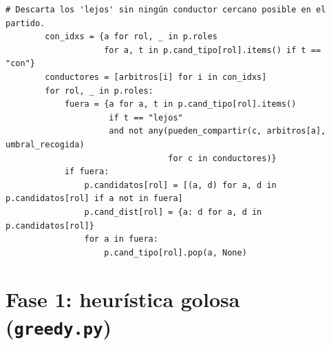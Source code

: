 \documentclass[11pt,a4paper,spanish]{book}
\numberwithin{equation}{chapter}
\numberwithin{figure}{chapter}
\numberwithin{table}{chapter}
\begin{document}
\begin{lstlisting}[caption={\texttt{datos.py} --- solape horario, coche compartido y cálculo de candidatos.}]
        # Descarta los 'lejos' sin ningún conductor cercano posible en el partido.
        con_idxs = {a for rol, _ in p.roles
                    for a, t in p.cand_tipo[rol].items() if t == "con"}
        conductores = [arbitros[i] for i in con_idxs]
        for rol, _ in p.roles:
            fuera = {a for a, t in p.cand_tipo[rol].items()
                     if t == "lejos"
                     and not any(pueden_compartir(c, arbitros[a], umbral_recogida)
                                 for c in conductores)}
            if fuera:
                p.candidatos[rol] = [(a, d) for a, d in p.candidatos[rol] if a not in fuera]
                p.cand_dist[rol] = {a: d for a, d in p.candidatos[rol]}
                for a in fuera:
                    p.cand_tipo[rol].pop(a, None)
\end{lstlisting}

\section{Fase 1: heurística golosa (\texttt{greedy.py})}
\end{document}
